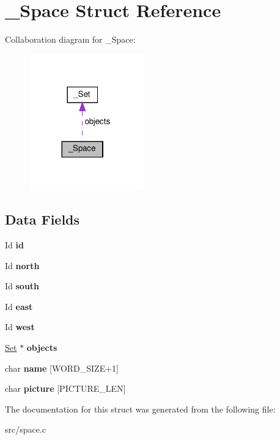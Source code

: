 \hypertarget{struct__Space}{}\section{\+\_\+\+Space Struct Reference}
\label{struct__Space}


Collaboration diagram for \+\_\+\+Space\+:\nopagebreak
\begin{figure}[H]
\begin{center}
\leavevmode
\includegraphics[width=140pt]{struct__Space__coll__graph}
\end{center}
\end{figure}
\subsection*{Data Fields}
\begin{DoxyCompactItemize}
\item 
\mbox{\label{struct__Space_a70cb461deb9ac073e401b607339b567f}} 
Id {\bfseries id}
\item 
\mbox{\label{struct__Space_ae5ebe53ce79514d7d2d93911e0159252}} 
Id {\bfseries north}
\item 
\mbox{\label{struct__Space_a646b68c22a0bbf1685033c96109d31d1}} 
Id {\bfseries south}
\item 
\mbox{\label{struct__Space_a41ce2bf33cf0c157b358221f094ee05b}} 
Id {\bfseries east}
\item 
\mbox{\label{struct__Space_a20c1d259e93b44e24ba82982e142eb9b}} 
Id {\bfseries west}
\item 
\mbox{\label{struct__Space_a661ed8b0fc8085b6db70188aa5085625}} 
\hyperlink{struct__Set}{Set} $\ast$ {\bfseries objects}
\item 
\mbox{\label{struct__Space_aa1c9c994c2d16ecf3ef46138685fdfdc}} 
char {\bfseries name} \mbox{[}W\+O\+R\+D\+\_\+\+S\+I\+ZE+1\mbox{]}
\item 
\mbox{\label{struct__Space_ab4b3f4af835727b6afe807d2aded4ff2}} 
char {\bfseries picture} \mbox{[}P\+I\+C\+T\+U\+R\+E\+\_\+\+L\+EN\mbox{]}
\end{DoxyCompactItemize}


The documentation for this struct was generated from the following file\+:\begin{DoxyCompactItemize}
\item 
src/space.\+c\end{DoxyCompactItemize}
